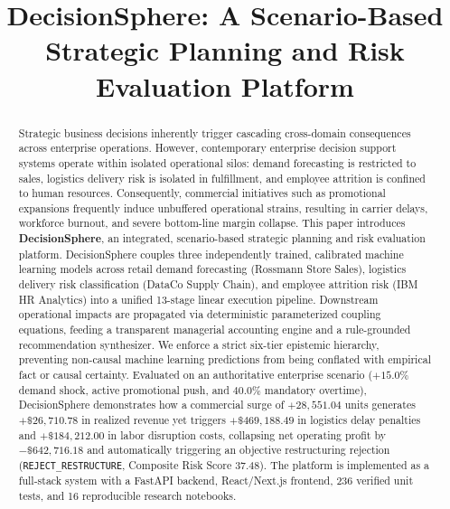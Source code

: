 \documentclass[10pt,conference]{IEEEtran}
\begin{document}
\title{DecisionSphere: A Scenario-Based Strategic Planning and Risk Evaluation Platform}

\author{
}

\maketitle

\begin{abstract}
Strategic business decisions inherently trigger cascading cross-domain consequences across enterprise operations. However, contemporary enterprise decision support systems operate within isolated operational silos: demand forecasting is restricted to sales, logistics delivery risk is isolated in fulfillment, and employee attrition is confined to human resources. Consequently, commercial initiatives such as promotional expansions frequently induce unbuffered operational strains, resulting in carrier delays, workforce burnout, and severe bottom-line margin collapse. This paper introduces \textbf{DecisionSphere}, an integrated, scenario-based strategic planning and risk evaluation platform. DecisionSphere couples three independently trained, calibrated machine learning models across retail demand forecasting (Rossmann Store Sales), logistics delivery risk classification (DataCo Supply Chain), and employee attrition risk (IBM HR Analytics) into a unified 13-stage linear execution pipeline. Downstream operational impacts are propagated via deterministic parameterized coupling equations, feeding a transparent managerial accounting engine and a rule-grounded recommendation synthesizer. We enforce a strict six-tier epistemic hierarchy, preventing non-causal machine learning predictions from being conflated with empirical fact or causal certainty. Evaluated on an authoritative enterprise scenario ($+15.0\%$ demand shock, active promotional push, and $40.0\%$ mandatory overtime), DecisionSphere demonstrates how a commercial surge of $+28,551.04$ units generates $+\$26,710.78$ in realized revenue yet triggers $+\$469,188.49$ in logistics delay penalties and $+\$184,212.00$ in labor disruption costs, collapsing net operating profit by $-\$642,716.18$ and automatically triggering an objective restructuring rejection (\texttt{REJECT\_RESTRUCTURE}, Composite Risk Score 37.48). The platform is implemented as a full-stack system with a FastAPI backend, React/Next.js frontend, 236 verified unit tests, and 16 reproducible research notebooks.
\end{abstract}
\end{document}
